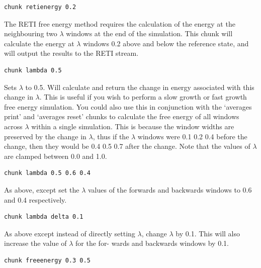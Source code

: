 \documentclass[letterpaper,10pt,english]{sphinxmanual}
\begin{document}
\begin{Verbatim}[commandchars=\\\{\}]
chunk retienergy 0.2
\end{Verbatim}

The RETI free energy method requires the calculation of the energy at the neighbouring two \(\lambda\) windows at the end of the simulation. This chunk will calculate the energy at \(\lambda\) windows 0.2 above and below the reference state, and will output the results to the RETI stream.

\begin{Verbatim}[commandchars=\\\{\}]
chunk lambda 0.5
\end{Verbatim}

Sets \(\lambda\) to 0.5. Will calculate and return the change in energy associated with this change in \(\lambda\). This is useful if you wish to perform a slow growth or fast growth free energy simulation. You could also use this in conjunction with the ‘averages print’ and ‘averages reset’ chunks to calculate the free energy of all windows across \(\lambda\) within a single simulation. This is because the window widths are preserved by the change in \(\lambda\), thus if the \(\lambda\) windows were 0.1 0.2 0.4 before the change, then they would be 0.4 0.5 0.7 after the change. Note that the values of \(\lambda\) are clamped between 0.0 and 1.0.

\begin{Verbatim}[commandchars=\\\{\}]
chunk lambda 0.5 0.6 0.4
\end{Verbatim}

As above, except set the \(\lambda\) values of the forwards and backwards windows to 0.6 and 0.4 respectively.

\begin{Verbatim}[commandchars=\\\{\}]
chunk lambda delta 0.1
\end{Verbatim}

As above except instead of directly setting \(\lambda\), change \(\lambda\) by 0.1. This will also increase the value of \(\lambda\) for the for- wards and backwards windows by 0.1.

\begin{Verbatim}[commandchars=\\\{\}]
chunk freeenergy 0.3 0.5
\end{Verbatim}
\end{document}
